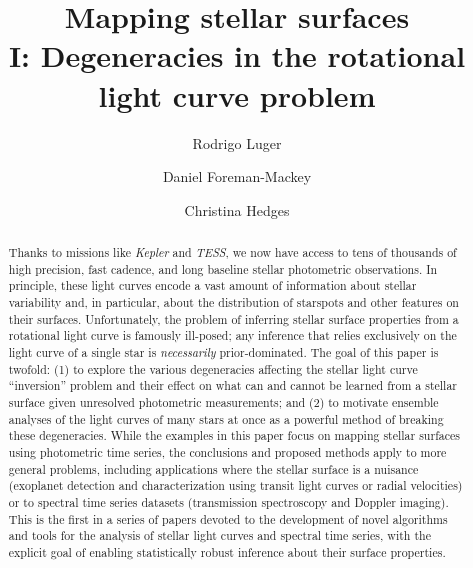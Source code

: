 \documentclass[modern]{aastex62}
\newcommand{\dfm}[1]{{\color{blue}#1}}
\begin{document}
\title{%
    \textbf{
        Mapping stellar surfaces\\
        I: Degeneracies in the rotational light curve problem
    }
}

\author[0000-0002-0296-3826]{Rodrigo Luger}
%
\author[0000-0002-9328-5652]{Daniel Foreman-Mackey}
%
\author[0000-0002-3385-8391]{Christina Hedges}
%



\begin{abstract}
    Thanks to missions like \emph{Kepler} and \emph{TESS}, we now
    have access to tens of thousands of high precision, fast
    cadence, and long baseline stellar photometric observations.
    In principle, these light curves encode a vast amount of information about
    stellar variability and, in particular, about the distribution of
    starspots and other features on their surfaces.
    Unfortunately, the problem of inferring stellar surface properties
    from a rotational light curve is famously ill-posed;
    any inference that relies exclusively on the light curve
    of a single star is \emph{necessarily} prior-dominated.
    The goal of this paper is twofold:
    (1) to explore the various degeneracies affecting the stellar
    light curve ``inversion'' problem and their effect on
    what can and cannot be learned from a stellar surface
    given unresolved photometric measurements; and
    (2) to motivate ensemble analyses of the light curves of
    many stars at once as a powerful method of breaking
    these degeneracies.
    \dfm{While the examples in this paper focus on mapping stellar surfaces
        using photometric time series, the conclusions and proposed methods
        apply to more general problems, including applications where the stellar
        surface is a nuisance (exoplanet detection and characterization using
        transit light curves or radial velocities) or to spectral time series
        datasets (transmission spectroscopy and Doppler imaging).}
    This is the first in a series of papers devoted to the development
    of novel algorithms and tools for the analysis of
    stellar light curves and spectral time series, with the
    explicit goal of enabling statistically robust inference
    about their surface properties.
\end{abstract}
\end{document}
